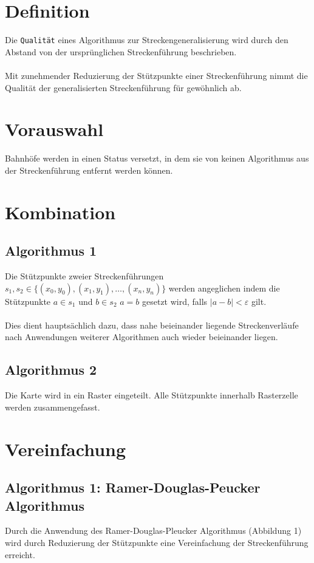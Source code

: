 \documentclass[twoside]{scrartcl}
\begin{document}
\section{Definition}
Die \texttt{Qualität} eines Algorithmus zur Streckengeneralisierung
wird durch den Abstand von der ursprünglichen Streckenführung
beschrieben.\\\\
Mit zunehmender Reduzierung der Stützpunkte einer Streckenführung
nimmt die Qualität der generalisierten Streckenführung für
gewöhnlich ab.
\section{Vorauswahl}
Bahnhöfe werden in einen Status versetzt, in dem sie von keinen
Algorithmus aus der Streckenführung entfernt werden können.
\section{Kombination}
\subsection{Algorithmus 1}
Die Stützpunkte zweier Streckenführungen
$s_1, s_2 \in \{(x_0, y_0), (x_1, y_1), \ldots, (x_n, y_n)\}$
werden angeglichen indem die Stützpunkte
$a \in s_1$ und  $b \in s_2$ $a = b$ gesetzt wird, falls
$|a - b| < \varepsilon$ gilt.\\
\\
Dies dient hauptsächlich dazu, dass nahe beieinander liegende
Streckenverläufe nach Anwendungen weiterer Algorithmen auch
wieder beieinander liegen.
\subsection{Algorithmus 2}
Die Karte wird in ein Raster eingeteilt. Alle Stützpunkte innerhalb
Rasterzelle werden zusammengefasst.
\section{Vereinfachung}
\subsection{Algorithmus 1: Ramer-Douglas-Peucker Algorithmus}
Durch die Anwendung des Ramer-Douglas-Pleucker Algorithmus
(Abbildung 1) 
wird durch Reduzierung der Stützpunkte eine Vereinfachung
der Streckenführung erreicht.\\
\end{document}

